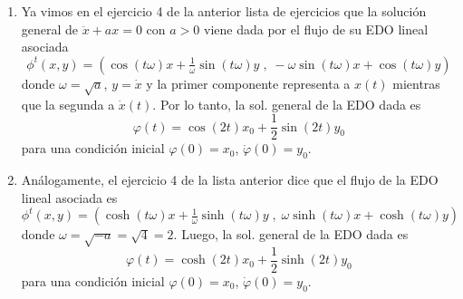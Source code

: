 \begin{sol}
\begin{enumerate}[leftmargin=*, label=(\alph*)]
\item Ya vimos en el ejercicio 4 de la anterior lista de ejercicios que la solución general de $\ddot{x} + ax = 0$ con $a>0$ viene dada por el flujo de su EDO lineal asociada
\[
\phi^t(x,y) = \left(%
        \cos(t\omega) x + \tfrac{1}{\omega}\sin(t\omega) y\;,\;%
        -\omega\sin(t\omega) x + \cos(t\omega) y
    \right)
\]
donde $\omega = \sqrt{a}$, $y = \dot{x}$ y la primer componente representa a $x(t)$ mientras que la segunda a $\dot{x}(t)$. Por lo tanto, la sol. general de la EDO dada es
\[
\varphi(t) =
        \cos(2t) x_0 + \frac{1}{2}\sin(2t) y_0
\]
para una condición inicial $\varphi(0) = x_0$, $\dot\varphi(0) = y_0$.

\item Análogamente, el ejercicio 4 de la lista anterior dice que el flujo de la EDO lineal asociada es
\[
\phi^t(x,y) = \left(%
        \cosh(t\omega) x + \tfrac{1}{\omega}\sinh(t\omega) y\;,\;%
        \omega\sinh(t\omega) x + \cosh(t\omega) y
    \right)
\]
donde $\omega = \sqrt{-a} = \sqrt{4} = 2$. Luego, la sol. general de la EDO dada es
\[
\varphi(t) =
        \cosh(2t) x_0 + \frac{1}{2}\sinh(2t) y_0
\]
para una condición inicial $\varphi(0) = x_0$, $\dot\varphi(0) = y_0$.


\end{enumerate}
\end{sol}

